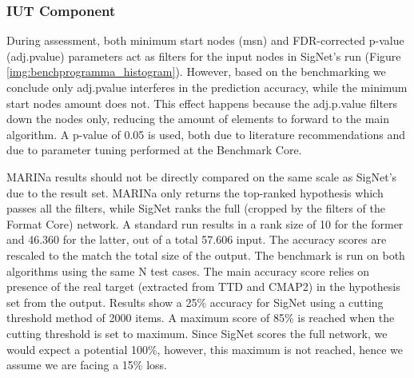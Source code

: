 \subsubsection{IUT Component}
During assessment, both minimum start nodes (msn) and FDR-corrected p-value (adj.pvalue) parameters act as filters for the input nodes in SigNet’s run (Figure \ref{img:benchprogramma_histogram}). However, based on the benchmarking we conclude only adj.pvalue interferes in the prediction accuracy, while the minimum start nodes amount does not. This effect happens because the adj.p.value filters down the nodes only, reducing the amount of elements to forward to the main algorithm. A p-value of 0.05 is used, both due to literature recommendations and due to parameter tuning performed at the Benchmark Core.
\\

\begin{table}[]
\centering
{}
\end{table}

MARINa results should not be directly compared on the same scale as SigNet’s due to the result set. MARINa only returns the top-ranked hypothesis which passes all the filters, while SigNet ranks the full (cropped by the filters of the Format Core) network. A standard run results in a rank size of 10 for the former and 46.360 for the latter, out of a total 57.606 input. The accuracy scores are rescaled to the match the total size of the output.
The benchmark is run on both algorithms using the same N test cases. The main accuracy score relies on presence of the real target (extracted from TTD and CMAP2) in the hypothesis set from the output. 
Results show a 25\% accuracy for SigNet using a cutting threshold method of 2000 items. A maximum score of 85\% is reached when the cutting threshold is set to maximum. Since SigNet scores the full network, we would expect a potential 100\%, however, this maximum is not reached, hence we assume we are facing a 15\% loss.
\\

